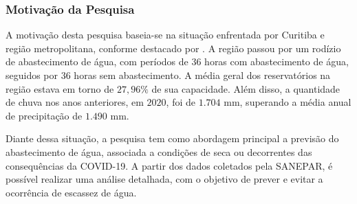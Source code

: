 %
%



  
      
\subsubsection{Motiva\c c\~ao da Pesquisa} \label{subsubsec:motivacao}

A motivação desta pesquisa baseia-se na situação enfrentada por Curitiba e região metropolitana, conforme destacado por \cite{vasconcelos_2020}. A região passou por um rodízio de abastecimento de água, com períodos de 36 horas com abastecimento de água, seguidos por 36 horas sem abastecimento. A média geral dos reservatórios na região estava em torno de $27,96\%$ de sua capacidade. Além disso, a quantidade de chuva nos anos anteriores, em $2020$, foi de $1.704$ mm, superando a média anual de precipitação de $1.490$ mm.

Diante dessa situação, a pesquisa tem como abordagem principal a previsão do abastecimento de água, associada a condições de seca ou decorrentes das consequências da COVID-19. A partir dos dados coletados pela SANEPAR, é possível realizar uma análise detalhada, com o objetivo de prever e evitar a ocorrência de escassez de água. 
 
% 	
%    
     
    